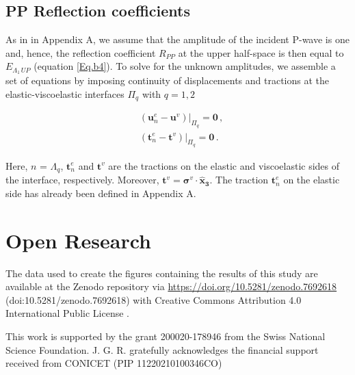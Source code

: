 \documentclass[draft]{agujournal2019}
\begin{document}
\subsection{PP Reflection coefficients}
As in in Appendix A, we assume that the amplitude of the incident P-wave is one and, hence, the reflection coefficient $R_{PP}$ at the upper half-space is then equal to $E_{\Lambda_1\, UP}$ (equation \eqref{Eq.b4}). To solve for the unknown amplitudes, we assemble a set of equations by imposing continuity of displacements and tractions at the elastic-viscoelastic interfaces $\Pi_q$ with $q=1,2$
\begin{linenomath*}
\begin{equation}\label{Eq.b10}
\begin{split}
&  \left. \left(  \bm{u}_n^e -  \bm{u}^v \right) \right \rvert_{\Pi_q} = \bm{0} \,, \\
&  \left. \left( \bm{t}_n^e  - \bm{t}^v  \right) \right \rvert_{\Pi_q} = \bm{0} \,.
\end{split}
\end{equation}
\end{linenomath*}
Here, $n$ = $\Lambda_q$, $\bm{t}_n^e$ and $\bm{t}^v$ are the tractions on the elastic and viscoelastic sides of the interface, respectively. Moreover, $\bm{t}^v =\bm{\sigma}^v \cdot \bm{\hat {x}_3} $. The traction $\bm{t}_n^e$ on the elastic side has already been defined in Appendix A.

\section*{Open Research}
The data used to create the figures containing the results of this study are available at the Zenodo repository via \url{https://doi.org/10.5281/zenodo.7692618} (doi:10.5281/zenodo.7692618) with Creative Commons Attribution 4.0 International Public License \cite{Sotelo2023}.

%

\acknowledgments
This work is supported by the grant 200020-178946 from the Swiss National Science Foundation. J. G. R. gratefully acknowledges the financial support received from CONICET (PIP 11220210100346CO)


%
%
\end{document}
